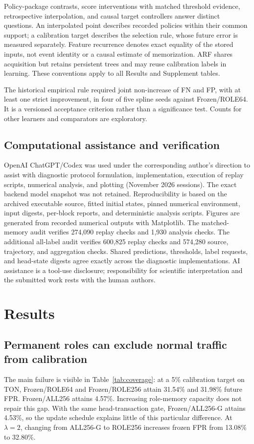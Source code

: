 Policy-package contrasts, score interventions with matched threshold evidence, retrospective interpolation, and causal target controllers answer distinct questions. An interpolated point describes recorded policies within their common support; a calibration target describes the selection rule, whose future error is measured separately. Feature recurrence denotes exact equality of the stored inputs, not event identity or a causal estimate of memorization. ARF shares acquisition but retains persistent trees and may reuse calibration labels in learning. These conventions apply to all Results and Supplement tables.

The historical empirical rule required joint non-increase of FN and FP, with at least one strict improvement, in four of five spline seeds against Frozen/ROLE64. It is a versioned acceptance criterion rather than a significance test. Counts for other learners and comparators are exploratory.

\subsection{Computational assistance and verification}
OpenAI ChatGPT/Codex was used under the corresponding author's direction to assist with diagnostic protocol formulation, implementation, execution of replay scripts, numerical analysis, and plotting (November 2026 sessions). The exact backend model snapshot was not retained. Reproducibility is based on the archived executable source, fitted initial states, pinned numerical environment, input digests, per-block reports, and deterministic analysis scripts. Figures are generated from recorded numerical outputs with Matplotlib. The matched-memory audit verifies 274,090 replay checks and 1,930 analysis checks. The additional all-label audit verifies 600,825 replay checks and 574,280 source, trajectory, and aggregation checks. Shared predictions, thresholds, label requests, and head-state digests agree exactly across the diagnostic implementations. AI assistance is a tool-use disclosure; responsibility for scientific interpretation and the submitted work rests with the human authors.

\section{Results}
\subsection{Permanent roles can exclude normal traffic from calibration}
The main failure is visible in Table~\ref{tab:coverage}: at a 5\% calibration target on TON, Frozen/ROLE64 and Frozen/ROLE256 attain 31.54\% and 31.98\% future FPR. Frozen/ALL256 attains 4.57\%. Increasing role-memory capacity does not repair this gap. With the same head-transaction gate, Frozen/ALL256-G attains 4.53\%, so the update schedule explains little of this particular difference. At $\lambda=2$, changing from ALL256-G to ROLE256 increases frozen FPR from 13.08\% to 32.80\%.

